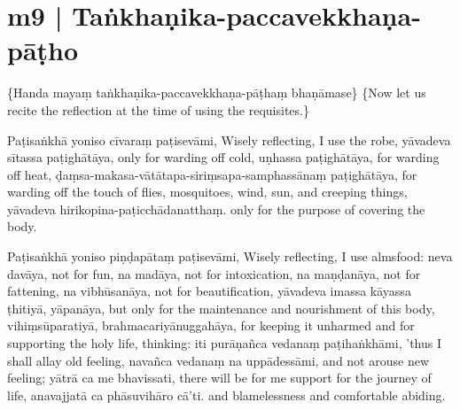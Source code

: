 \section*{m9 | Taṅkhaṇika-paccavekkhaṇa-pāṭho}

\begin{chantsubsection}
  \chantnote
    {\{Handa mayaṃ taṅkhaṇika-paccavekkhaṇa-pāṭhaṃ bhaṇāmase\}}
  \chantnotetrans
    {\{Now let us recite the reflection at the time of using the requisites.\}}
  \chantgap

  \chantlineinline
    {Paṭisaṅkhā yoniso cīvaraṃ paṭisevāmi,}
    {Wisely reflecting, I use the robe,}
  \chantlineinline
    {yāvadeva sītassa paṭighātāya,}
    {only for warding off cold,}
  \chantlineinline
    {uṇhassa paṭighātāya,}
    {for warding off heat,}
  \chantlineinline
      {ḍaṃsa-makasa-vātātapa-siriṃsapa-samphassānaṃ paṭighātāya,}
    {for warding off the touch of flies, mosquitoes, wind, sun, and creeping things,}
  \chantlineinline
    {yāvadeva hirikopina-paṭicchādanatthaṃ.}
    {only for the purpose of covering the body.}

\chantgap

  \chantlineinline
    {Paṭisaṅkhā yoniso piṇḍapātaṃ paṭisevāmi,}
    {Wisely reflecting, I use almsfood:}
  \chantlineinline
    {neva davāya,}
    {not for fun,}
  \chantlineinline
    {na madāya,}
    {not for intoxication,}
  \chantlineinline
    {na maṇḍanāya,}
    {not for fattening,}
  \chantlineinline
    {na vibhūsanāya,}
    {not for beautification,}
  \chantlineinline
    {yāvadeva imassa kāyassa ṭhitiyā, yāpanāya,}
    {but only for the maintenance and nourishment of this body,}
  \chantlineinline
    {vihiṃsūparatiyā, brahmacariyānuggahāya,}
    {for keeping it unharmed and for supporting the holy life, thinking:}
  \chantlineinline
    {iti purāṇañca vedanaṃ paṭihaṅkhāmi,}
    {'thus I shall allay old feeling,}
  \chantlineinline
    {navañca vedanaṃ na uppādessāmi,}
    {and not arouse new feeling;}
  \chantlineinline
    {yātrā ca me bhavissati,}
    {there will be for me support for the journey of life,}
  \chantlineinline
    {anavajjatā ca phāsuvihāro cā'ti.}
    {and blamelessness and comfortable abiding.}

\end{chantsubsection}
\chantgap
